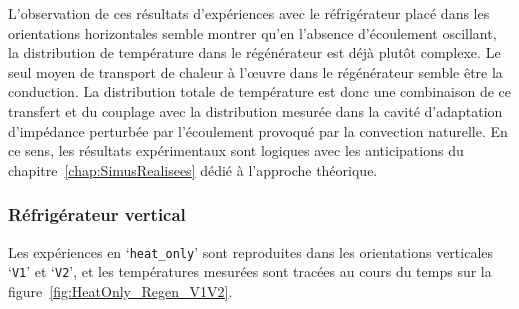 L'observation de ces résultats d'expériences avec le réfrigérateur placé dans les orientations horizontales semble montrer qu'en l'absence d'écoulement oscillant, la distribution de température dans le régénérateur est déjà plutôt complexe. Le seul moyen de transport de chaleur à l'\oe{}uvre dans le régénérateur semble être la conduction. La distribution totale de température est donc une combinaison de ce transfert et du couplage avec la distribution mesurée dans la cavité d'adaptation d'impédance perturbée par l'écoulement provoqué par la convection naturelle. En ce sens, les résultats expérimentaux sont logiques avec les anticipations du chapitre~\ref{chap:SimusRealisees} dédié à l'approche théorique.\bigskip

\subsubsection{Réfrigérateur vertical}

Les expériences en `\texttt{heat\_only}' sont reproduites dans les orientations verticales `\texttt{V1}' et `\texttt{V2}', et les températures mesurées sont tracées au cours du temps sur la figure~\ref{fig:HeatOnly_Regen_V1V2}.\smallskip

